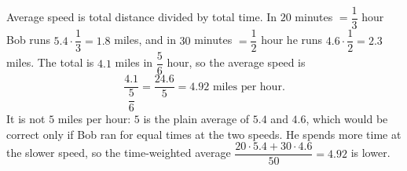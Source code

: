 Average speed is total distance divided by total time. In $20$ minutes $=\dfrac{1}{3}$ hour Bob runs $5.4\cdot\dfrac{1}{3}=1.8$ miles, and in $30$ minutes $=\dfrac{1}{2}$ hour he runs $4.6\cdot\dfrac{1}{2}=2.3$ miles. The total is $4.1$ miles in $\dfrac{5}{6}$ hour, so the average speed is
\[
\dfrac{4.1}{\dfrac{5}{6}}=\dfrac{24.6}{5}=\boxed{4.92\text{ miles per hour}} .
\]
It is not $5$ miles per hour: $5$ is the plain average of $5.4$ and $4.6$, which would be correct only if Bob ran for equal times at the two speeds. He spends more time at the slower speed, so the time-weighted average $\dfrac{20\cdot5.4+30\cdot4.6}{50}=4.92$ is lower.
